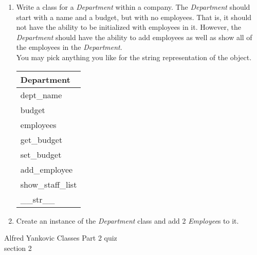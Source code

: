 \documentclass{article}
\begin{document}
\begin{enumerate}
\begin{enumerate}
		\item 
			Write a class for a \textit{Department} within a company. The \textit{Department} should 
			start with a name and a budget, but with no employees. That is, it should not have the ability to be
			initialized with employees in it. However, the \textit{Department} should have the ability to add 
			employees as well as show all of the employees in the \textit{Department}.\\
			You may pick anything you like for the string representation of the object.
			\begin{flushright}
			\begin{tabular}{|l|} \hline 
				Department\\ \hline
				dept\_name\\ budget\\ employees\\ \hline
				get\_budget\\ set\_budget\\ add\_employee\\ show\_staff\_list\\ 
					\_\_str\_\_ \\ \hline
			\end{tabular}
			\end{flushright}

		\item
			Create an instance of the \textit{Department} class and add 2 \textit{Employee}s to it.
	\end{enumerate}
\pagebreak

\end{enumerate}
\pagebreak
Alfred Yankovic \hfill Classes Part 2 quiz\\
section 2\\
\end{document}
